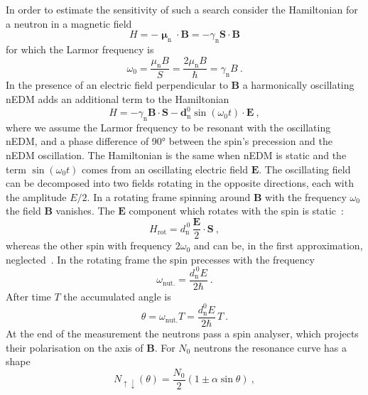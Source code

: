 In order to estimate the sensitivity of such a search consider the Hamiltonian for a neutron in a magnetic field
\begin{equation}
  H = - \boldsymbol{\upmu}_\text{n} \cdot \mathbf{B} = - \gamma_\text{n} \mathbf{S} \cdot \mathbf{B}
\end{equation}
for which the Larmor frequency is
\begin{equation}
  \omega_0 = \frac{\mu_\text{n} B}{S} = \frac{2 \mu_\text{n} B}{\hbar} = \gamma_\text{n} B \ .
\end{equation}
In the presence of an electric field perpendicular to $\mathbf{B}$ a harmonically oscillating nEDM adds an additional term to the Hamiltonian
\begin{equation}
  H = - \gamma_\text{n} \mathbf{B} \cdot \mathbf{S} - \mathbf{d}_\text{n}^0 \sin (\omega_0 t) \cdot \mathbf{E} \ ,
\end{equation}
where we assume the Larmor frequency to be resonant with the oscillating nEDM, and a phase difference of \ang{90} between the spin's precession and the nEDM oscillation.
The Hamiltonian is the same when nEDM is static and the term $\sin (\omega_0 t)$ comes from an oscillating electric field $\mathbf{E}$. The oscillating field can be decomposed into two fields rotating in the opposite directions, each with the amplitude $E/2$. In a rotating frame spinning around $\mathbf{B}$ with the frequency $\omega_0$ the field $\mathbf{B}$ vanishes. The $\mathbf{E}$ component which rotates with the spin is static~\cite{RamseyBook}:
\begin{equation}
  H_\text{rot} = d_\text{n}^{\,0} \, \frac{\mathbf{E}}{2} \cdot \mathbf{S} \ ,
\end{equation}
whereas the other spin with frequency $2 \omega_0$ and can be, in the first approximation, neglected~\cite{RamseyBook}.
In the rotating frame the spin precesses with the frequency
\begin{equation}
  \omega_\text{nut.} = \frac{d_\text{n}^{\,0} E }{2 \hbar} \ .
\end{equation}
After time $T$ the accumulated angle is
\begin{equation}
  \theta = \omega_\text{nut.} T = \frac{d_\text{n}^0 E }{2 \hbar} \, T \ .
  \label{eq:resonant_the_angle}
\end{equation}
At the end of the measurement the neutrons pass a spin analyser, which projects their polarisation on the axis of $\mathbf{B}$.
For $N_0$ neutrons the resonance curve has a shape
\begin{equation}
  N_{\uparrow \downarrow}(\theta) = \frac{N_0}{2} \left( 1 \pm \alpha \sin \theta  \right)  \ ,
\end{equation}
